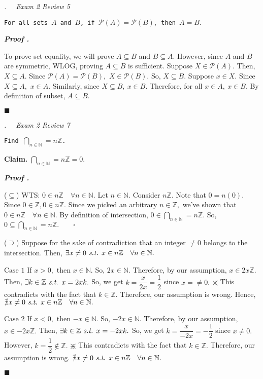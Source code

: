 \documentclass[11pt,letter]{article}
\newcounter{nq}[section]
\newcounter{np}[section]
\newenvironment*{p}{\par\noindent\textbf{\textit{Proof \stepcounter{np}\thenp. }}\par}{\par\hfill $\blacksquare$\par}
\newenvironment*{q}[1]{\noindent\emph{\thesection.\stepcounter{nq}\thenq$\quad $ #1}\par\noindent\texttt}{}
\newenvironment*{clm}{\par\noindent\textbf{Claim. }}{\par}
\def\Z{{\mathbb{Z}}}
\def\N{{\mathbb{N}}}
\def\pwer{{\mathcal{P}}}
\def\st{\emph{ s.t. }}
\def\dsst{\displaystyle}
\begin{document}
\begin{framed}\begin{q}
	{Exam 2 Review 5}
	{For all sets $A$ and $B$, if $\pwer(A)=\pwer(B),$ then $A=B.$}
\end{q}\end{framed}
\begin{p}
	To prove set equality, we will prove $A\subseteq B$ and $B\subseteq A$. However, since $A$ and $B$ are symmetric, WLOG, proving $A\subseteq B$ is sufficient. Suppose $X\in\pwer(A).$ Then, $X\subseteq A$. Since $\pwer(A)=\pwer(B),$ $X\in\pwer(B).$ So, $X\subseteq B.$ Suppose $x\in X.$ Since $X\subseteq A,$ $x\in A.$ Similarly, since $X\subseteq B,\ x\in B.$ Therefore, for all $x\in A,\ x\in B.$ By definition of subset, $A\subseteq B.$
\end{p}

\begin{framed}\begin{q}
	{Exam 2 Review 7}
	{Find $\dsst\bigcap_{n\in\N}=n\Z$.}
\end{q}\end{framed}
\begin{clm}
	$\dsst\bigcap_{n\in\N}=n\Z=\qty{0}.$
\end{clm}
\begin{p}
	($\subseteq$) WTS: $0\in n\Z\quad\forall n\in\N.$ Let $n\in\N$. Consider $n\Z$. Note that $0=n(0).$ Since $0\in\Z,0\in n\Z.$ Since we picked an arbitrary $n\in\Z,$ we've shown that $0\in n\Z\quad\forall n\in\N.$ By definition of intersection, $0\in\dsst\bigcap_{n\in\N}=n\Z.$ So, $\qty{0}\subseteq\dsst\bigcap_{n\in\N}=n\Z.\qquad\square$\par 
	($\supseteq$) Suppose for the sake of contradiction that an integer $\neq0$ belongs to the intersection. Then, $\exists x\neq0\st x\in n\Z\quad\forall n\in\N.$\par 
	$\boxed{\text{Case }1}$ If $x>0,$ then $x\in\N.$ So, $2x\in\N.$ Therefore, by our assumption, $x\in 2x\Z.$ Then, $\exists k\in\Z\st x=2xk.$ So, we get $k=\dfrac{x}{2x}=\dfrac{1}{2}$ since $x=\neq0.$ $\divideontimes$ This contradicts with the fact that $k\in\Z.$ Therefore, our assumption is wrong. Hence, $\nexists x\neq0\st x\in n\Z\quad\forall n\in\N.$\par 
	$\boxed{\text{Case }2}$ If $x<0,$ then $-x\in\N.$ So, $-2x\in\N.$ Therefore, by our assumption, $x\in-2x\Z.$ Then, $\exists k\in\Z\st x=-2xk.$ So, we get $k=\dfrac{x}{-2x}=-\dfrac{1}{2}$ since $x\neq0.$ However, $k=\dfrac{1}{2}\notin\Z.$ $\divideontimes$ This contradicts with the fact that $k\in\Z.$ Therefore, our assumption is wrong. $\nexists x\neq0\st x\in n\Z\quad\forall n\in\N.$
\end{p}
\end{document}
